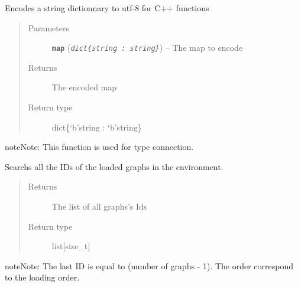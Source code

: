 \documentclass[letterpaper,10pt,english]{sphinxmanual}
\begin{document}

\begin{fulllineitems}
\label{doc:gedlibpy.encode_your_map}
Encodes a string dictionnary to utf-8 for C++ functions
\begin{quote}\begin{description}
\item[{Parameters}] \leavevmode
\textbf{\texttt{map}} (\emph{\texttt{dict\{string : string\}}}) -- The map to encode

\item[{Returns}] \leavevmode
The encoded map

\item[{Return type}] \leavevmode
dict\{`b'string : `b'string\}

\end{description}\end{quote}

\begin{notice}{note}{Note:}
This function is used for type connection.
\end{notice}

\end{fulllineitems}


\begin{fulllineitems}
\label{doc:gedlibpy.get_all_graph_ids}
Searchs all the IDs of the loaded graphs in the environment.
\begin{quote}\begin{description}
\item[{Returns}] \leavevmode
The list of all graphs's Ids

\item[{Return type}] \leavevmode
list{[}size\_t{]}

\end{description}\end{quote}

\begin{notice}{note}{Note:}
The last ID is equal to (number of graphs - 1). The order correspond to the loading order.
\end{notice}

\end{fulllineitems}
\end{document}
